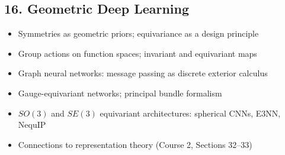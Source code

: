 \subsection{16. Geometric Deep Learning}
\begin{itemize}
\item Symmetries as geometric priors; equivariance as a design principle
\item Group actions on function spaces; invariant and equivariant maps
\item Graph neural networks: message passing as discrete exterior calculus
\item Gauge-equivariant networks; principal bundle formalism
\item $SO(3)$ and $SE(3)$ equivariant architectures: spherical CNNs, E3NN, NequIP
\item Connections to representation theory (Course 2, Sections 32--33)
\end{itemize}
